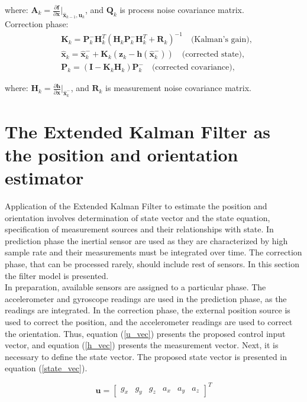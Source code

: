 where: $\bm{A}_k = \frac{\partial \bm{f}}{\partial \bm{x}}\Bigr|_{\bm{\hat{x}}_{k-1}, \bm{u}_k}$, and $\bm{Q}_k$ is process noise covariance matrix.\\

Correction phase:
\begin{align}
	&\bm{K}_k = \bm{P}_k^- \bm{H}_k^T (\bm{H}_k \bm{P}_k^- \bm{H}_k^T + \bm{R}_k)^{-1} \quad \text{(Kalman's gain)}, \\
	&\bm{\hat{x}}_k = \bm{\hat{x}}_k^- + \bm{K}_k(\bm{\bm{z}}_k - \bm{h}(\bm{\hat{x}}_k^-)) \quad \text{(corrected state)}, \\
	&\bm{P}_k = (\bm{I} - \bm{K}_k \bm{H}_k) \bm{P}_k^- \quad \text{(corrected covariance)},
\end{align}

where: $\bm{H}_k = \frac{\partial \bm{h}}{\partial \bm{x}}\Bigr|_{\bm{\hat{x}}_k^-}$, and $\bm{R}_k$ is measurement noise covariance matrix.



\section{The  Extended Kalman Filter as the position and orientation estimator}
\label{filter_model}

Application of the Extended Kalman Filter to estimate the position and orientation involves determination of state vector and the state equation, specification of measurement sources and their relationships with state. In prediction phase the inertial sensor are used as they are characterized by high sample rate and their measurements must be integrated over time. The correction phase, that can be processed rarely, should include rest of sensors. In this section the filter model is presented.\\

In preparation, available sensors are assigned to a particular phase. The accelerometer and gyroscope readings are used in the prediction phase, as the readings are integrated. In the correction phase, the external position source is used to correct the position, and the accelerometer readings are used to correct the orientation. Thus, equation (\ref{u_vec}) presents the proposed control input vector, and equation (\ref{h_vec}) presents the measurement vector. Next, it is necessary to define the state vector. The proposed state vector is presented in equation (\ref{state_vec}).

\begin{equation}
	\bm{u} = \begin{bmatrix}
		g_x & g_y & g_z & a_x & a_y & a_z
	\end{bmatrix}^T
	\label{u_vec}
\end{equation}

